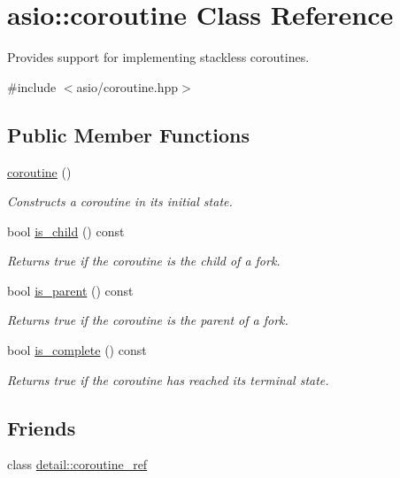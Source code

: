 \hypertarget{classasio_1_1coroutine}{}\section{asio\+:\+:coroutine Class Reference}
\label{classasio_1_1coroutine}


Provides support for implementing stackless coroutines.  




{\ttfamily \#include $<$asio/coroutine.\+hpp$>$}

\subsection*{Public Member Functions}
\begin{DoxyCompactItemize}
\item 
\hyperlink{classasio_1_1coroutine_aae689a0aee08699c9d68bdc9d246b5cb}{coroutine} ()
\begin{DoxyCompactList}\small\item\em Constructs a coroutine in its initial state. \end{DoxyCompactList}\item 
bool \hyperlink{classasio_1_1coroutine_ab7693e381b3fc429bc12393c73f507a3}{is\+\_\+child} () const 
\begin{DoxyCompactList}\small\item\em Returns true if the coroutine is the child of a fork. \end{DoxyCompactList}\item 
bool \hyperlink{classasio_1_1coroutine_ab5ed275eee663bca6638668ff27dd40d}{is\+\_\+parent} () const 
\begin{DoxyCompactList}\small\item\em Returns true if the coroutine is the parent of a fork. \end{DoxyCompactList}\item 
bool \hyperlink{classasio_1_1coroutine_a31134bbc275316e9bea1e08df9021a68}{is\+\_\+complete} () const 
\begin{DoxyCompactList}\small\item\em Returns true if the coroutine has reached its terminal state. \end{DoxyCompactList}\end{DoxyCompactItemize}
\subsection*{Friends}
\begin{DoxyCompactItemize}
\item 
class \hyperlink{classasio_1_1coroutine_a481da3cf2fa1764180915143c632eb2e}{detail\+::coroutine\+\_\+ref}
\end{DoxyCompactItemize}


